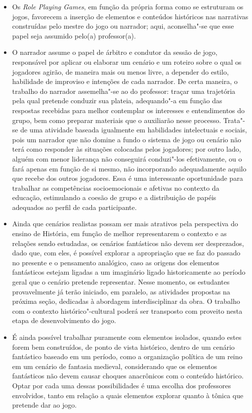 \documentclass[11pt]{extarticle}
\begin{document}
\begin{itemize}
\item
  Os \emph{Role Playing Games}, em função da própria forma como se
  estruturam os jogos, favorecem a inserção de elementos e conteúdos
  históricos nas narrativas construídas pelo mestre do jogo ou narrador;
  aqui, aconselha"-se que esse papel seja assumido pelo(a) professor(a).
\item
  O narrador assume o papel de árbitro e condutor da sessão de jogo,
  responsável por aplicar ou elaborar um cenário e um roteiro sobre o
  qual os jogadores agirão, de maneira mais ou menos livre, a depender
  do estilo, habilidade de improviso e intenções de cada narrador. De
  certa maneira, o trabalho do narrador assemelha"-se ao do professor:
  traçar uma trajetória pela qual pretende conduzir sua plateia,
  adequando"-a em função das respostas recebidas para melhor contemplar
  os interesses e entendimentos do grupo, bem como preparar materiais
  que o auxiliarão nesse processo. Trata"-se de uma atividade baseada
  igualmente em habilidades intelectuais e sociais, pois um narrador que
  não domine a fundo o sistema de jogo ou cenário não terá como
  responder às situações colocadas pelos jogadores; por outro lado,
  alguém com menor liderança não conseguirá conduzi"-los efetivamente, ou
  o fará apenas em função de si mesmo, não incorporando adequadamente
  aquilo que recebe dos outros jogadores. Essa é uma interessante
  oportunidade para trabalhar as competências socioemocionais e afetivas
  no contexto da educação, estimulando a coesão de grupo e a
  distribuição de papéis adequados ao perfil de cada participante.
\item
  Ainda que cenários realistas possam ser mais atrativos pela
  perspectiva do ensino de História, em função de melhor representarem o
  contexto e as relações sendo estudadas, os cenários fantásticos não
  devem ser desprezados, dado que, com eles, é possível explorar a
  apropriação que se faz do passado no presente e o pensamento
  analógico, caso as origens dos elementos fantásticos estejam ligadas a
  um imaginário ligado historicamente ao período geral que o cenário
  pretende representar. Nesse momento, os estudantes provavelmente já
  terão iniciado, em paralelo, as atividades propostas na próxima seção,
  dedicadas à abordagem interdisciplinar da obra. O trabalho com o
  contexto histórico"-cultural poderá ser transposto com proveito nesta
  etapa de desenvolvimento do jogo.
\item
  É ainda possível trabalhar puramente com elementos isolados, quando
  estes forem bem construídos, de ponto de vista histórico, dentro de um
  cenário fantástico baseado em um período, como a organização política
  de um reino em um cenário de fantasia medieval, considerando que os
  elementos fantásticos não devem causar choques anacrônicos com o
  conteúdo histórico. Optar por cada uma dessas possibilidades é uma
  escolha dos professores envolvidos, tanto em relação a quais elementos
  explorar quanto à tônica que pretende dar ao jogo.
\end{itemize}
\end{document}
